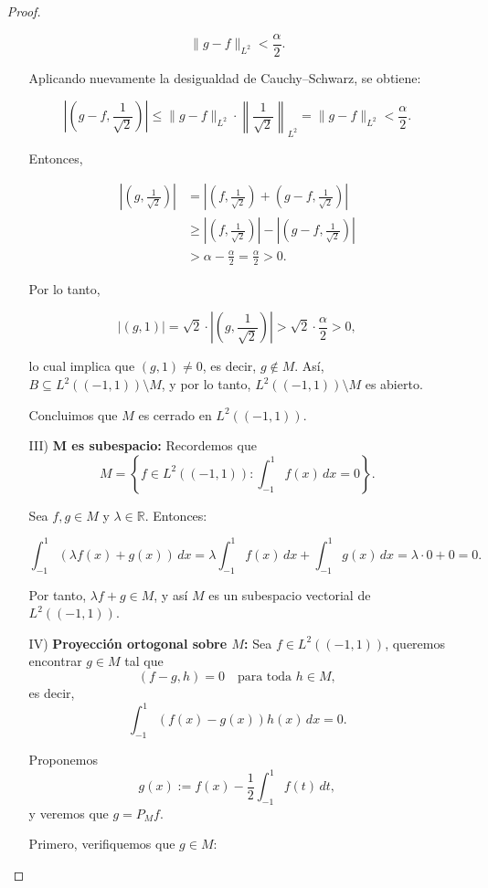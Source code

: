 \begin{itemize}
\begin{proof}
\begin{enumerate}
\[
\|g - f\|_{L^2} < \frac{\alpha}{2}.
\]

Aplicando nuevamente la desigualdad de Cauchy–Schwarz, se obtiene:

\[
\left| \left( g - f, \frac{1}{\sqrt{2}} \right) \right| \leq \|g - f\|_{L^2} \cdot \left\| \frac{1}{\sqrt{2}} \right\|_{L^2} = \|g - f\|_{L^2} < \frac{\alpha}{2}.
\]


Entonces,

\begin{align*}
\left| \left( g, \frac{1}{\sqrt{2}} \right) \right| &= \left| \left( f, \frac{1}{\sqrt{2}} \right) + \left( g - f, \frac{1}{\sqrt{2}} \right) \right| \\
&\geq \left| \left( f, \frac{1}{\sqrt{2}} \right) \right| - \left| \left( g - f, \frac{1}{\sqrt{2}} \right) \right| \\
&> \alpha - \frac{\alpha}{2} = \frac{\alpha}{2} > 0.
\end{align*}

Por lo tanto,

\[
|(g,1)| = \sqrt{2} \cdot \left| \left( g, \frac{1}{\sqrt{2}} \right) \right| > \sqrt{2} \cdot \frac{\alpha}{2} > 0,
\]

lo cual implica que \( (g,1) \neq 0 \), es decir, \( g \notin M \). Así, \( B \subseteq L^2((-1,1)) \setminus M \), y por lo tanto, \( L^2((-1,1)) \setminus M \) es abierto.

Concluimos que \( M \) es cerrado en \( L^2((-1,1)) \).
\item[III)] \textbf{M es subespacio:} Recordemos que
\[
M = \left\{ f \in L^2((-1,1)) : \int_{-1}^{1} f(x)\,dx = 0 \right\}.
\]

Sea \( f, g \in M \) y \( \lambda \in \mathbb{R} \). Entonces:

\[
\int_{-1}^{1} (\lambda f(x) + g(x))\, dx = \lambda \int_{-1}^{1} f(x)\, dx + \int_{-1}^{1} g(x)\, dx = \lambda \cdot 0 + 0 = 0.
\]

Por tanto, \( \lambda f + g \in M \), y así \( M \) es un subespacio vectorial de \( L^2((-1,1)) \).

\item[IV)] \textbf{Proyección ortogonal sobre \( M \):}  Sea \( f \in L^2((-1,1)) \), queremos encontrar \( g \in M \) tal que
\[
(f - g, h) = 0 \quad \text{para toda } h \in M,
\]
es decir,
\[
\int_{-1}^{1} (f(x) - g(x)) h(x)\, dx = 0.
\]

Proponemos
\[
g(x) := f(x) - \frac{1}{2} \int_{-1}^{1} f(t)\,dt,
\]
y veremos que \( g = P_M f \).

\vspace{0.5em}
Primero, verifiquemos que \( g \in M \):


\end{enumerate}
\end{proof}
\end{itemize}
